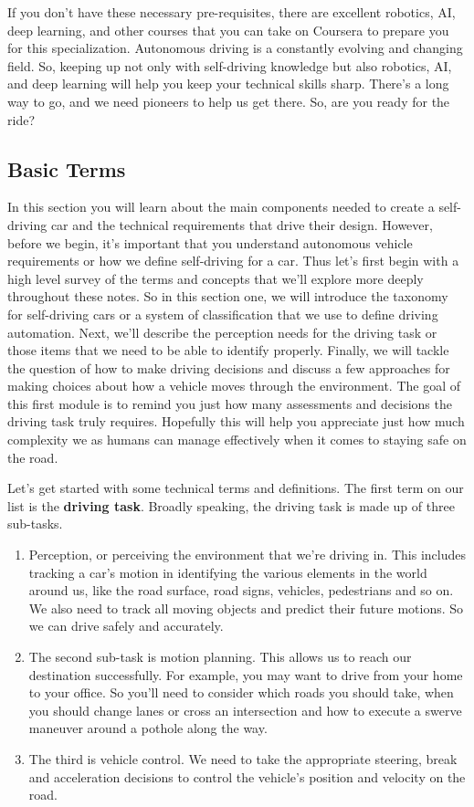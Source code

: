 If you don't have these necessary pre-requisites, there are excellent robotics, AI, deep learning, and other courses that you can take on Coursera to prepare you for this specialization. Autonomous driving is a constantly evolving and changing field. So, keeping up not only with self-driving knowledge but also robotics, AI, and deep learning will help you keep your technical skills sharp. 
There's a long way to go, and we need pioneers to help us get there. So, are you ready for the ride?


\subsection{Basic Terms}

In this section you will learn about the main components needed to create a self-driving car and the technical requirements that drive their design. 
However, before we begin, it's important that you understand autonomous vehicle requirements or how we define self-driving for a car. 
Thus let's  first begin with a high level survey of the terms and concepts that we'll explore more deeply throughout these notes. So in this section one, we will introduce  
the taxonomy for self-driving cars or a system of classification that we use to define driving automation. Next, we'll describe the perception needs for the driving task or those items that we need to be able to identify properly. Finally, we will tackle the question of how to make driving decisions and discuss a few approaches for making choices about how a vehicle moves through the environment. 
The goal of this first module is to remind you just how many assessments and decisions the driving task truly requires. Hopefully this will help you appreciate just how much complexity we as humans can manage effectively when it comes to staying safe on the road. 

Let's get started with some technical terms and definitions.  The first term on our list is the {\textbf{driving task}}. Broadly speaking, the driving task is made up of three sub-tasks. 

\begin{enumerate}
\item Perception, or perceiving the environment that we're driving in. This includes tracking a car's motion in identifying the various elements in the world around us, like the road surface, road signs, vehicles, pedestrians and so on. We also need to track all moving objects and predict their future motions. So we can drive safely and accurately. 
\item The second sub-task is motion planning. This allows us to reach our destination successfully. For example, you may want to drive from your home to your office. So you'll need to consider which roads you should take, when you should change lanes or cross an intersection and how to execute a swerve maneuver around a pothole along the way. 
\item The third is vehicle control. We need to take the appropriate steering, break and acceleration decisions to control the vehicle's position and velocity on the road. 
\end{enumerate}

